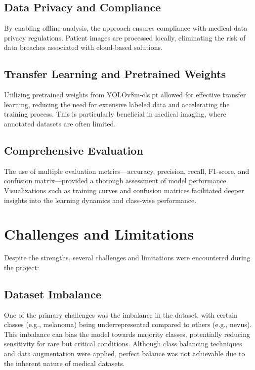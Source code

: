 \documentclass[a4paper,12pt]{report}
\begin{document}
\begin{spacing}{1.5}
        \subsection*{Data Privacy and Compliance}
        By enabling offline analysis, the approach ensures compliance with medical data privacy regulations. Patient images are processed locally, eliminating the risk of data breaches associated with cloud-based solutions.
        
        \subsection*{Transfer Learning and Pretrained Weights}
        Utilizing pretrained weights from YOLOv8m-cls.pt allowed for effective transfer learning, reducing the need for extensive labeled data and accelerating the training process. This is particularly beneficial in medical imaging, where annotated datasets are often limited.
        
        \subsection*{Comprehensive Evaluation}
        The use of multiple evaluation metrics—accuracy, precision, recall, F1-score, and confusion matrix—provided a thorough assessment of model performance. Visualizations such as training curves and confusion matrices facilitated deeper insights into the learning dynamics and class-wise performance.

    \newpage

    \section{Challenges and Limitations}
    
    Despite the strengths, several challenges and limitations were encountered during the project:
    
        \subsection*{Dataset Imbalance}
        One of the primary challenges was the imbalance in the dataset, with certain classes (e.g., melanoma) being underrepresented compared to others (e.g., nevus). This imbalance can bias the model towards majority classes, potentially reducing sensitivity for rare but critical conditions. Although class balancing techniques and data augmentation were applied, perfect balance was not achievable due to the inherent nature of medical datasets.
        

\end{spacing}
\end{document}
